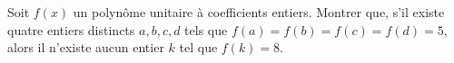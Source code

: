 Soit $f(x)$ un polynôme unitaire à coefficients entiers. Montrer que, s'il existe quatre entiers distincts $a, b, c, d$ tels que $f(a) = f(b) = f(c) = f(d) = 5$, alors il n'existe aucun entier $k$ tel que $f(k) = 8$.
